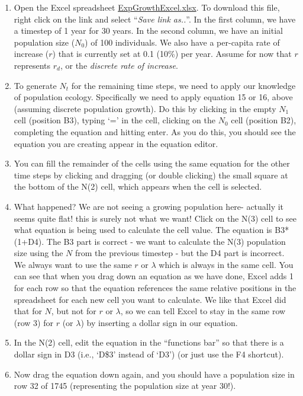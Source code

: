 \documentclass[
]{article}
\begin{document}
\begin{enumerate}
\def\labelenumi{\arabic{enumi}.}
\item
  Open the Excel spreadsheet \url{ExpGrowthExcel.xlsx}. To download this
  file, right click on the link and select ``\emph{Save link as..}''. In
  the first column, we have a timestep of 1 year for 30 years. In the
  second column, we have an initial population size (\(N_0\)) of 100
  individuals. We also have a per-capita rate of increase (\(r\)) that
  is currently set at 0.1 (10\%) per year. Assume for now that \(r\)
  represents \(r_d\), or the \emph{discrete rate of increase}.
\item
  To generate \(N_t\) for the remaining time steps, we need to apply our
  knowledge of population ecology. Specifically we need to apply
  equation 15 or 16, above (assuming discrete population growth). Do
  this by clicking in the empty \(N_{1}\) cell (position B3), typing `='
  in the cell, clicking on the \(N_{0}\) cell (position B2), completing
  the equation and hitting enter. As you do this, you should see the
  equation you are creating appear in the equation editor.
\item
  You can fill the remainder of the cells using the same equation for
  the other time steps by clicking and dragging (or double clicking) the
  small square at the bottom of the N(2) cell, which appears when the
  cell is selected.
\item
  What happened? We are not seeing a growing population here- actually
  it seems quite flat! this is surely not what we want! Click on the
  N(3) cell to see what equation is being used to calculate the cell
  value. The equation is B3*(1+D4). The B3 part is correct - we want to
  calculate the N(3) population size using the \(N\) from the previous
  timestep - but the D4 part is incorrect. We always want to use the
  same \(r\) or \(\lambda\) which is always in the same cell. You can
  see that when you drag down an equation as we have done, Excel adds 1
  for each row so that the equation references the same relative
  positions in the spreadsheet for each new cell you want to calculate.
  We like that Excel did that for \(N\), but not for \(r\) or
  \(\lambda\), so we can tell Excel to stay in the same row (row 3) for
  \(r\) (or \(\lambda\)) by inserting a dollar sign in our equation.
\item
  In the N(2) cell, edit the equation in the ``functions bar'' so that
  there is a dollar sign in D3 (i.e., `D\$3' instead of `D3') (or just
  use the F4 shortcut).
\item
  Now drag the equation down again, and you should have a population
  size in row 32 of 1745 (representing the population size at year 30!).
\end{enumerate}
\end{document}
